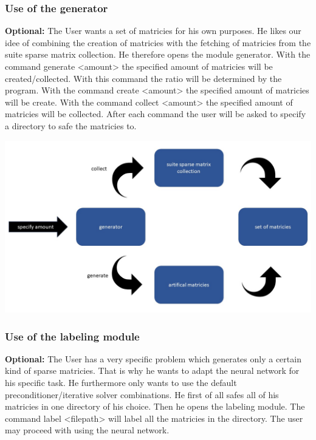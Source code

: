 \documentclass[parskip=full]{scrartcl}
\begin{document}
\subsubsection{Use of the generator}
\textbf{Optional:} The User wants a set of matricies for his own purposes. He likes our idee of combining the creation of matricies with the fetching of matricies from the suite sparse matrix collection. He therefore opens the module generator. With the command generate <amount> the specified amount of matricies will be created/collected. With this command the ratio will be determined by the program. With the command create <amount> the specified amount of matricies will be create.  With the command collect <amount> the specified amount of matricies will be collected. After each command the user will be asked to specify a directory to safe the matricies to.
\begin{center}
\includegraphics[width=\textwidth]{generator}
\end{center}

\subsubsection{Use of the labeling module}
\textbf{Optional:} The User has a very specific problem which generates only a certain kind of sparse matricies. That is why he wants to adapt the neural network for his specific task. He furthermore only wants to use the default preconditioner/iterative solver combinations. He first of all safes all of his matricies in one directory of his choice. Then he opens the labeling module. The command label <filepath> will label all the matricies in the directory. The user may proceed with using the neural network.
\end{document}
